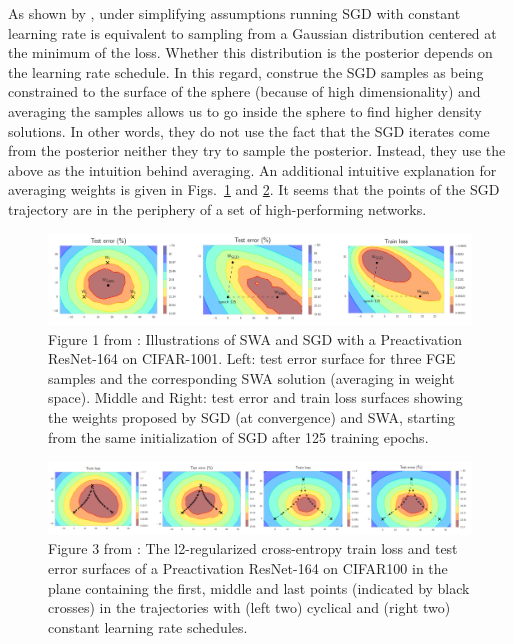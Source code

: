 As shown by \textcite{mandt2017stochastic}, under simplifying assumptions running SGD with constant learning rate is equivalent to sampling from a Gaussian distribution centered at the minimum of the loss. 
Whether this distribution is the posterior depends on the learning rate schedule. 
In this regard, \textcite{izmailov2019averaging} construe the SGD samples as being constrained to the surface of the sphere (because of high dimensionality) and averaging the samples allows us to go inside the sphere to find higher density solutions. 
In other words, they do not use the fact that the SGD iterates come from the posterior neither they try to sample the posterior.
Instead, they use the above as the intuition behind averaging. 
An additional intuitive explanation for averaging weights is given in Figs.~\ref{averweights} and \ref{averweights2}.
It seems that the points of the SGD trajectory are in the periphery of a set of high-performing networks. 
\begin{figure}[H]
	\centering
	\includegraphics[width=1\linewidth]{./Figures/averweights.png}
	\caption{Figure 1 from \textcite{izmailov2019averaging}:  Illustrations of SWA and SGD with a Preactivation ResNet-164 on CIFAR-1001. Left: test error surface for three FGE samples and the corresponding SWA solution (averaging in weight space). Middle and Right: test error and train loss surfaces showing the weights proposed by SGD (at convergence) and SWA, starting from the same initialization of SGD after 125 training epochs.}
	\label{averweights}
\end{figure}
\begin{figure}[H]
	\centering
	\includegraphics[width=1\linewidth]{./Figures/averweights2.png}
	\caption{Figure 3 from \textcite{izmailov2019averaging}:  The l2-regularized cross-entropy train loss and test error surfaces of a Preactivation ResNet-164 on CIFAR100 in the plane containing the first, middle and last points (indicated by black crosses) in the trajectories with (left two) cyclical and (right two) constant learning rate schedules.}
	\label{averweights2}
\end{figure}

